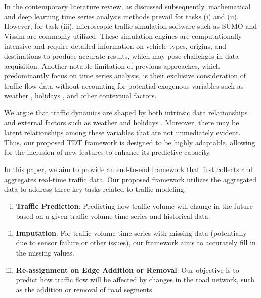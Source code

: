 In the contemporary literature review, as discussed subsequently, mathematical and deep learning time series analysis methods prevail for tasks (i) and (ii). However, for task (iii), microscopic traffic simulation software such as SUMO \cite{sumo} and Vissim \cite{vissim} are commonly utilized. These simulation engines are computationally intensive and require detailed information on vehicle types, origins, and destinations to produce accurate results, which may pose challenges in data acquisition. Another notable limitation of previous approaches, which predominantly focus on time series analysis, is their exclusive consideration of traffic flow data without accounting for potential exogenous variables such as weather \cite{weather}, holidays \cite{holiday}, and other contextual factors.

We argue that traffic dynamics are shaped by both intrinsic data relationships and external factors such as weather \cite{weather} and holidays \cite{holiday}. Moreover, there may be latent relationships among these variables that are not immediately evident. Thus, our proposed TDT framework is designed to be highly adaptable, allowing for the inclusion of new features to enhance its predictive capacity.

In this paper, we aim to provide an end-to-end framework that first collects and aggregates real-time traffic data. Our proposed framework utilizes the aggregated data to address three key tasks related to traffic modeling:
\begin{enumerate}[(i)]
\item \textbf{Traffic Prediction}: Predicting how traffic volume will change in the future based on a given traffic volume time series and historical data.
\item \textbf{Imputation}: For traffic volume time series with missing data (potentially due to sensor failure or other issues), our framework aims to accurately fill in the missing values.
\item \textbf{Re-assignment on Edge Addition or Removal}: Our objective is to predict how traffic flow will be affected by changes in the road network, such as the addition or removal of road segments.
\end{enumerate}

